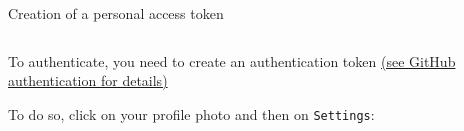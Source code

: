 \documentclass[10pt]{beamer}
\begin{document}
\begin{frame}[fragile]{Creation of a personal access token}

\begin{columns}
\begin{column}{0.6\textwidth}
   
To authenticate, you need to create an authentication token 
\href{https://docs.github.com/en/authentication/keeping-your-account-and-data-secure/creating-a-personal-access-token}{(see GitHub authentication for details)}

\vspace{0.5cm}
To do so, click on your profile photo and then on \texttt{Settings}:

\end{column}
\begin{column}{0.33\textwidth}  
    \begin{center}

\end{center}
\end{column}
\end{columns}
\end{frame}
\end{document}
